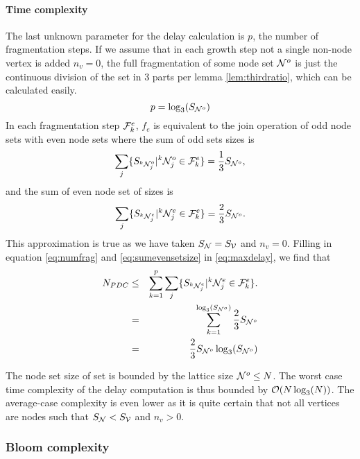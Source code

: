\paragraph{Time complexity}
The last unknown parameter for the delay calculation is $p$, the number of fragmentation steps. If we assume that in each growth step not a single non-node vertex is added $n_v = 0$, the full fragmentation of some node set $\mathcal{N}^o$ is just the continuous division of the set in 3 parts per lemma \ref{lem:thirdratio}, which can be calculated easily.
\begin{equation}\label{eq:numfrag}
  p = \log_3(S_{\mathcal{N}^o})
\end{equation}
In each fragmentation step $\mathcal{F}^e_k$, $f_e$ is equivalent to the join operation of odd node sets with even node sets where the sum of odd sets sizes is
\begin{equation}\label{eq:sumoddsetsize}
  \sum_j \{ S_{{}^{k}\mathcal{N}_j^o} | {}^{k}\mathcal{N}_j^o \in \mathcal{F}^e_k \} = \frac{1}{3}S_{\mathcal{N}^o},
\end{equation}
and the sum of even node set of sizes is
\begin{equation}\label{eq:sumevensetsize}
  \sum_j \{ S_{{}^{k}\mathcal{N}_j^e} | {}^{k}\mathcal{N}_j^e \in \mathcal{F}^e_k \} = \frac{2}{3}S_{\mathcal{N}^o}.
\end{equation}
This approximation is true as we have taken $S_{\mathcal{N}} = S_{\mathcal{V}}$ and $n_v=0$. Filling in equation \ref{eq:numfrag} and \ref{eq:sumevensetsize} in \ref{eq:maxdelay}, we find that
\begin{eqnarray}
\nonumber  N_{PDC} &\leq& \sum_{k=1}^{p} \sum_j \{ S_{{}^{k}\mathcal{N}_j^e} | {}^{k}\mathcal{N}_j^e \in \mathcal{F}^e_k \}. \\
\nonumber   &=& \sum_{k=1}^{\log_3(S_{\mathcal{N}^o})} \frac{2}{3}S_{\mathcal{N}^o} \\
   &=& \frac{2}{3}S_{\mathcal{N}^o}\log_3(S_{\mathcal{N}^o})
\end{eqnarray}

The node set size of set is bounded by the lattice size $\mathcal{N}^o \leq N$. The worst case time complexity of the delay computation is thus bounded by $\mathcal{O}(N\log_3(N))$. The average-case complexity is even lower as it is quite certain that not all vertices are nodes such that $S_{\mathcal{N}} < S_{\mathcal{V}}$ and $n_v > 0$.

\subsubsection{Bloom complexity}

